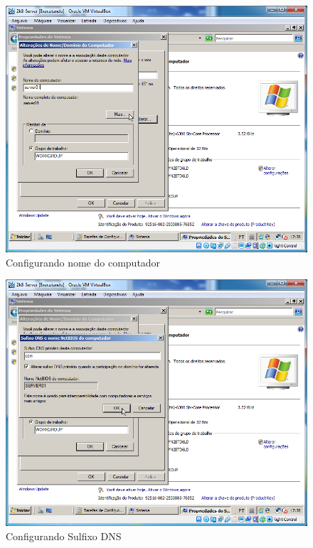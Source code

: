 \documentclass[10pt]{article}
\begin{document}
\begin{figure}[H]
    \centering
    \caption{Configurando nome do computador}
    \label{fig:4224}
    \includegraphics[width=\linewidth]{images/configuracao_windows/windows_server/011.png}
\end{figure}
\begin{figure}[H]
    \centering
    \caption{Configurando Sulfixo DNS}
    \label{fig:4225}
    \includegraphics[width=\linewidth]{images/configuracao_windows/windows_server/012.png}
\end{figure}
\end{document}

